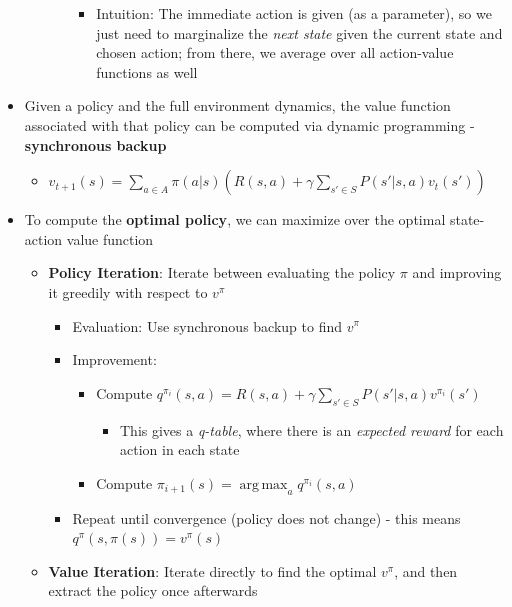 \documentclass{article}
\providecommand{\tightlist}{%
  \setlength{\itemsep}{\GlobalItemSep}\setlength{\parskip}{\GlobalListParSkip}}
\newlength{\GlobalItemSep}
\newlength{\GlobalListParSkip}
\DeclareMathOperator*{\argmax}{arg\,max}
\begin{document}
\begin{multicols}{2}
\begin{itemize}
\begin{itemize}
\begin{itemize}
      \begin{itemize}
      \tightlist
      \item
        Intuition: The immediate action is given (as a parameter), so we
        just need to marginalize the \emph{next state} given the current
        state and chosen action; from there, we average over all
        action-value functions as well
      \end{itemize}
    \end{itemize}
  \end{itemize}
\item
  Given a policy and the full environment dynamics, the value function
  associated with that policy can be computed via dynamic programming -
  \textbf{synchronous backup}

  \begin{itemize}
  \tightlist
  \item
    \(v_{t+1}(s) = \sum_{a \in A}\pi(a|s) (R(s, a) + \gamma \sum_{s' \in S} P(s' | s, a) v_t (s'))\)
  \end{itemize}
\item
  To compute the \textbf{optimal policy}, we can maximize over the
  optimal state-action value function

  \begin{itemize}
  \tightlist
  \item
    \textbf{Policy Iteration}: Iterate between evaluating the policy
    \(\pi\) and improving it greedily with respect to \(v^\pi\)

    \begin{itemize}
    \tightlist
    \item
      Evaluation: Use synchronous backup to find \(v^\pi\)
    \item
      Improvement:

      \begin{itemize}
      \tightlist
      \item
        Compute
        \(q^{\pi_i}(s, a) = R(s, a) + \gamma \sum_{s' \in S}P(s' | s, a) v^{\pi_i}(s')\)

        \begin{itemize}
        \tightlist
        \item
          This gives a \emph{q-table}, where there is an \emph{expected
          reward} for each action in each state
        \end{itemize}
      \item
        Compute \(\pi_{i + 1}(s) = \argmax_{a} q^{\pi_i}(s, a)\)
      \end{itemize}
    \item
      Repeat until convergence (policy does not change) - this means
      \(q^\pi(s, \pi(s)) = v^\pi(s)\)
    \end{itemize}
  \item
    \textbf{Value Iteration}: Iterate directly to find the optimal
    \(v^\pi\), and then extract the policy once afterwards


\end{itemize}
\end{itemize}
\end{multicols}
\end{document}
